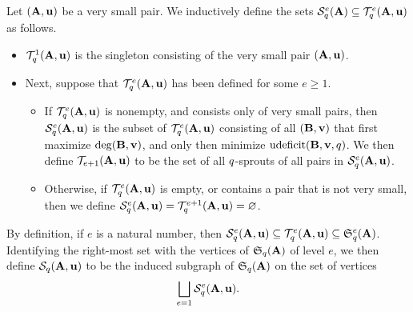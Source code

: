 \documentclass{amsart}
\begin{document}
\begin{definition}
	\label{subgraph: D}
   Let $(\mathbf{A}, \mathbf{u})$ be a very small pair.  We inductively define the sets $\mathcal{S}_{q}^e(\mathbf{A}) \subseteq \mathcal{T}_{q}^e(\mathbf{A}, \mathbf{u})$ as follows.
   
   \begin{itemize}
   \item $\mathcal{T}_{q}^1(\mathbf{A}, \mathbf{u})$ is the singleton consisting of the very small pair $(\mathbf{A}, \mathbf{u})$.  
   \item Next, suppose that $\mathcal{T}_{q}^e(\mathbf{A}, \mathbf{u})$ has been defined for some $e \geq 1$.
   \begin{itemize}
   \item  If $\mathcal{T}_{q}^e(\mathbf{A}, \mathbf{u})$ is nonempty, and consists only of very small pairs, then $
   \mathcal{S}_{q}^e(\mathbf{A}, \mathbf{u})$ is the subset of $\mathcal{T}_{q}^e(\mathbf{A}, \mathbf{u})$ consisting of all $(\mathbf{B},\mathbf{v})$ that first maximize $\operatorname{deg}(\mathbf{B},\mathbf{v})$, and only then minimize $\operatorname{udeficit}(\mathbf{B},\mathbf{v},q)$.  We then define $\mathcal{T}_{e+1}(\mathbf{A},\mathbf{u})$ to be the set of all $q$-sprouts of all pairs in $\mathcal{S}_{q}^e(\mathbf{A},\mathbf{u})$.
      \item Otherwise, if $\mathcal{T}_{q}^e(\mathbf{A}, \mathbf{u})$ is empty,  or contains a pair that is not very small, then we define $\mathcal{S}_{q}^e(\mathbf{A},\mathbf{u})=\mathcal{T}_{q}^{e+1}(\mathbf{A},\mathbf{u}) = \varnothing$.
   \end{itemize}
   \end{itemize}
   
   By definition, if $e$ is a natural number, then $\mathcal{S}_{q}^e(\mathbf{A},\mathbf{u}) \subseteq \mathcal{T}_{q}^e(\mathbf{A},\mathbf{u}) \subseteq \mathfrak{S}_{q}^e(\mathbf{A})$.  Identifying the right-most set with the vertices of $\mathfrak{S}_q(\mathbf{A})$ of level $e$, we then define $\mathcal{S}_{q}(\mathbf{A},\mathbf{u})$ to be the induced subgraph of $\mathfrak{S}_{q}(\mathbf{A})$ on the set of vertices
   \[ \bigsqcup_{e=1} \mathcal{S}_{q}^e(\mathbf{A},\mathbf{u}). \]


\end{definition}
\end{document}
